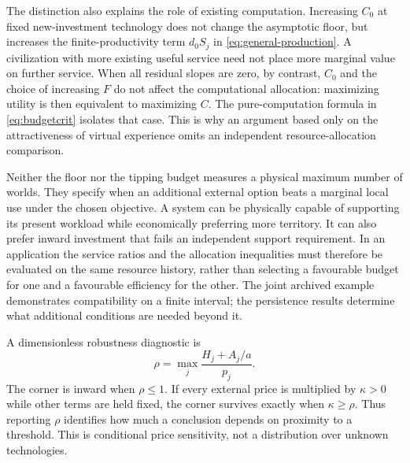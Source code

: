 The distinction also explains the role of existing computation. Increasing
$C_0$ at fixed new-investment technology does not change the asymptotic
floor, but increases the finite-productivity term $d_0S_j$ in
\cref{eq:general-production}. A civilization with more existing useful
service need not place more marginal value on further service. When all
residual slopes are zero, by contrast, $C_0$ and the choice of increasing
$F$ do not affect the computational allocation: maximizing utility is
then equivalent to maximizing $C$. The pure-computation formula in
\cref{eq:budgetcrit} isolates that case. This is why an argument based
only on the attractiveness of virtual experience omits an independent
resource-allocation comparison.

Neither the floor nor the tipping budget measures a physical maximum
number of worlds. They specify when an additional external option beats
a marginal local use under the chosen objective. A system can be physically
capable of supporting its present workload while economically preferring
more territory. It can also prefer inward investment that fails an
independent support requirement. In an application the service ratios and
the allocation inequalities must therefore be evaluated on the same
resource history, rather than selecting a favourable budget for one and a
favourable efficiency for the other. The joint archived example demonstrates
compatibility on a finite interval; the persistence results determine what
additional conditions are needed beyond it.

A dimensionless robustness diagnostic is
\begin{equation}
 \rho=\max_j\frac{H_j+A_j/a}{p_j}.
 \label{eq:rho}
\end{equation}
The corner is inward when $\rho\leq1$. If every external price is multiplied by $\kappa>0$ while other terms are held fixed, the corner survives exactly when $\kappa\geq\rho$. Thus reporting $\rho$ identifies how much a conclusion depends on proximity to a threshold. This is conditional price sensitivity, not a distribution over unknown technologies.

